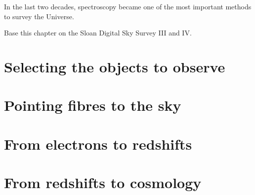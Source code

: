 \chaptertoc{}

\vspace{1em}

In the last two decades, spectroscopy became one of the most important
methods to survey the Universe. 

Base this chapter on the Sloan Digital Sky Survey III and IV. 

\section{Selecting the objects to observe}


\section{Pointing fibres to the sky}


\section{From electrons to redshifts}


\section{From redshifts to cosmology}

